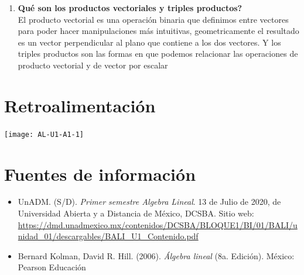 \documentclass[12pt]{article}
\begin{document}
\begin{enumerate}
		\item \textbf{Qué son los productos vectoriales y triples productos?} \\ El producto vectorial es una operación binaria que definimos entre vectores para poder hacer manipulaciones más intuitivas, geometricamente el resultado es un vector perpendicular al plano que contiene a los dos vectores. Y los triples productos son las formas en que podemos relacionar las operaciones de producto vectorial y de vector por escalar

	\end{enumerate}
\section{Retroalimentaci\'on}
	
	\texttt{[image: AL-U1-A1-1]}


\section*{Fuentes de informaci\'on}
	\begin{itemize}
		\item UnADM. (S/D). \textit{Primer semestre Algebra Lineal}. 13 de Julio de 2020, de Universidad Abierta y a Distancia de M\'exico, DCSBA. Sitio web: \url{https://dmd.unadmexico.mx/contenidos/DCSBA/BLOQUE1/BI/01/BALI/unidad_01/descargables/BALI_U1_Contenido.pdf}
		\item Bernard Kolman, David R. Hill. (2006). \textit{Álgebra lineal} (8a. Edición). México: Pearson Educación
	\end{itemize}
\end{document}
